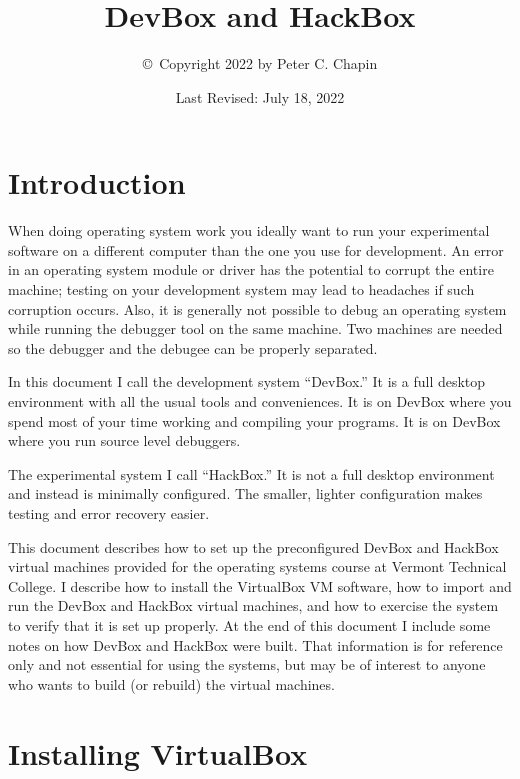 \documentclass[twocolumn]{article}
\begin{document}
\title{DevBox and HackBox}
\author{\copyright\ Copyright 2022 by Peter C. Chapin}
\date{Last Revised: July 18, 2022}
\maketitle

\tableofcontents

\section{Introduction}

When doing operating system work you ideally want to run your experimental software on a
different computer than the one you use for development. An error in an operating system module
or driver has the potential to corrupt the entire machine; testing on your development system
may lead to headaches if such corruption occurs. Also, it is generally not possible to debug an
operating system while running the debugger tool on the same machine. Two machines are needed so
the debugger and the debugee can be properly separated.

In this document I call the development system ``DevBox.'' It is a full desktop environment with
all the usual tools and conveniences. It is on DevBox where you spend most of your time working
and compiling your programs. It is on DevBox where you run source level debuggers.

The experimental system I call ``HackBox.'' It is not a full desktop environment and instead is
minimally configured. The smaller, lighter configuration makes testing and error recovery
easier.

This document describes how to set up the preconfigured DevBox and HackBox virtual machines
provided for the operating systems course at Vermont Technical College. I describe how to
install the VirtualBox VM software, how to import and run the DevBox and HackBox virtual
machines, and how to exercise the system to verify that it is set up properly. At the end of
this document I include some notes on how DevBox and HackBox were built. That information is for
reference only and not essential for using the systems, but may be of interest to anyone who
wants to build (or rebuild) the virtual machines.

\section{Installing VirtualBox}
\end{document}
